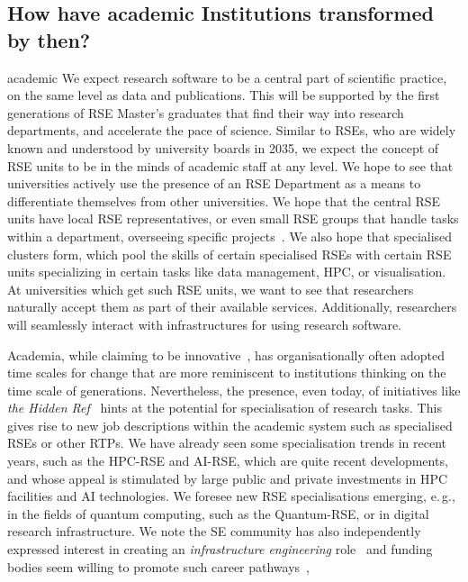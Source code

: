 \documentclass{eceasst}
\newcommand{\eg}{e.\,g.}
\begin{document}
\subsection{How have academic Institutions transformed by then?}
\begin{whatis}{}{academic}
We expect research software to be a central part of scientific practice, on the same level as data and publications.
This will be supported by the first generations of RSE Master's graduates that find their way into research departments, and accelerate the pace of science.
Similar to RSEs, who are widely known and understood by university boards in 2035, we expect the concept of RSE units to be in the minds
of academic staff at any level.
We hope to see that universities actively use the presence of an RSE Department as a means to differentiate themselves from other universities.
We hope that the central RSE units have local RSE representatives, or even small RSE groups that handle tasks within a department, overseeing specific projects~\cite{Kempf2025-draft}.
We also hope that specialised clusters form, which pool the skills of certain specialised RSEs with certain RSE units specializing in certain tasks like data management, HPC, or visualisation.
At universities which get such RSE units, we want to see that researchers naturally accept them as part of their available services.
Additionally, researchers will seamlessly interact with infrastructures for using research software.
\end{whatis}
Academia, while claiming to be innovative~\cite{wzvgbayern},
has organisationally often adopted time scales for change that are more reminiscent
to institutions thinking on the time scale of generations.
Nevertheless, the presence, even today, of initiatives like \emph{the Hidden Ref}~\cite{hiddenref}
hints at the potential for specialisation of research tasks.
This gives rise to new job descriptions within the academic system such as specialised RSEs or other RTPs.
We have already seen some specialisation trends in recent years,
such as the HPC-RSE and AI-RSE, which are quite recent developments,
and whose appeal is stimulated by large public and private investments in HPC facilities and AI technologies.
We foresee new RSE specialisations emerging, \eg, in the fields of quantum computing,
such as the Quantum-RSE, or in digital research infrastructure.
We note the SE community has also independently expressed interest in creating an \emph{infrastructure engineering} role~\cite{Sochat2024Infra}
and funding bodies seem willing to promote such career pathways~\cite{UKRI2025Infra,EuroHPC2024Federated},
\end{document}
